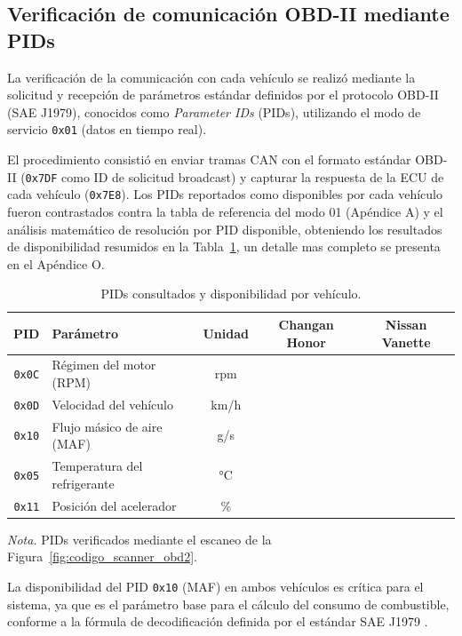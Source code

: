 \subsection{Verificación de comunicación OBD-II mediante PIDs}

La verificación de la comunicación con cada vehículo 
se realizó mediante la solicitud y recepción de 
parámetros estándar definidos por el protocolo 
OBD-II (SAE J1979), conocidos como \textit{Parameter 
	IDs} (PIDs), utilizando el modo de servicio 
\texttt{0x01} (datos en tiempo real).

El procedimiento consistió en enviar tramas CAN 
con el formato estándar OBD-II (\texttt{0x7DF} 
como ID de solicitud broadcast) y capturar la 
respuesta de la ECU de cada vehículo 
(\texttt{0x7E8}). Los PIDs reportados como disponibles por cada 
vehículo fueron contrastados contra la tabla 
de referencia del modo 01 (Apéndice A) 
y el análisis matemático de resolución por PID 
disponible, obteniendo los 
resultados de disponibilidad resumidos en la 
Tabla~\ref{tab:pids_verificacion}, un detalle mas completo se presenta en el Apéndice O.

\begin{table}[H]
	\centering
	\caption{PIDs consultados y disponibilidad por vehículo.}
	\label{tab:pids_verificacion}
	\begin{tabular}{clccc}
		\toprule
		\rowcolor[rgb]{.851,.851,.851}
		\textbf{PID} & \textbf{Parámetro} & \textbf{Unidad} & \textbf{Changan Honor} & \textbf{Nissan Vanette} \\
		\midrule
		\texttt{0x0C} & Régimen del motor (RPM) & rpm & \checkmark & \checkmark \\
		\texttt{0x0D} & Velocidad del vehículo & km/h & \checkmark & \checkmark \\
		\texttt{0x10} & Flujo másico de aire (MAF) & g/s &  & \checkmark \\
		\texttt{0x05} & Temperatura del refrigerante & °C & \checkmark & \checkmark \\
		\texttt{0x11} & Posición del acelerador & \% & \checkmark & \checkmark \\
		\bottomrule
	\end{tabular}
	\vskip 0.15cm
	{\footnotesize \textit{Nota.} PIDs verificados mediante el escaneo de la Figura~\ref{fig:codigo_scanner_obd2}.}
\end{table}

La disponibilidad del PID \texttt{0x10} (MAF) 
en ambos vehículos es crítica para el sistema,
ya que es el parámetro base para el
cálculo del consumo de combustible, conforme
a la fórmula de decodificación definida por 
el estándar SAE J1979 \citep{sae_j1979_2014}.

